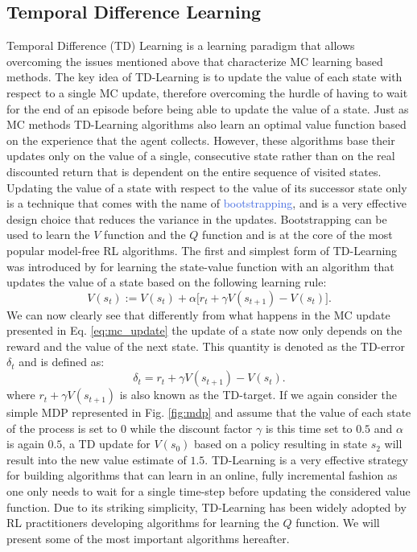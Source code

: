 \subsection{Temporal Difference Learning}
\label{sec:td_learning}
Temporal Difference (TD) Learning \cite{sutton1984temporal,sutton1988learning} is a learning paradigm that allows overcoming the issues mentioned above that characterize MC learning based methods. The key idea of TD-Learning is to update the value of each state with respect to a single MC update, therefore overcoming the hurdle of having to wait for the end of an episode before being able to update the value of a state. Just as MC methods TD-Learning algorithms also learn an optimal value function based on the experience that the agent collects. However, these algorithms base their updates only on the value of a single, consecutive state rather than on the real discounted return that is dependent on the entire sequence of visited states. Updating the value of a state with respect to the value of its successor state only is a technique that comes with the name of \textcolor{RoyalBlue}{bootstrapping}, and is a very effective design choice that reduces the variance in the updates. Bootstrapping can be used to learn the $V$ function and the $Q$ function and is at the core of the most popular model-free RL algorithms. The first and simplest form of TD-Learning was introduced by \citet{sutton1988learning} for learning the state-value function with an algorithm that updates the value of a state based on the following learning rule:
\begin{equation}
	V(s_t):= V(s_t) + \alpha \big[r_t + \gamma V(s_{t+1}) - V(s_t)\big].
	\label{eq:td_learning_v}
\end{equation}
We can now clearly see that differently from what happens in the MC update presented in Eq. \ref{eq:mc_update} the update of a state now only depends on the reward and the value of the next state. This quantity is denoted as the TD-error $\delta_t$ and is defined as:
\begin{equation}
	\delta_t = r_t + \gamma V(s_{t+1}) - V(s_t).
\end{equation}
where $r_t + \gamma V(s_{t+1})$ is also known as the TD-target.
If we again consider the simple MDP represented in Fig. \ref{fig:mdp} and assume that the value of each state of the process is set to $0$ while the discount factor $\gamma$ is this time set to $0.5$ and $\alpha$ is again $0.5$, a TD update for $V(s_0)$ based on a policy resulting in state $s_2$ will result into the new value estimate of $1.5$. 
TD-Learning is a very effective strategy for building algorithms that can learn in an online, fully incremental fashion as one only needs to wait for a single time-step before updating the considered value function. Due to its striking simplicity, TD-Learning has been widely adopted by RL practitioners developing algorithms for learning the $Q$ function. We will present some of the most important algorithms hereafter. 

